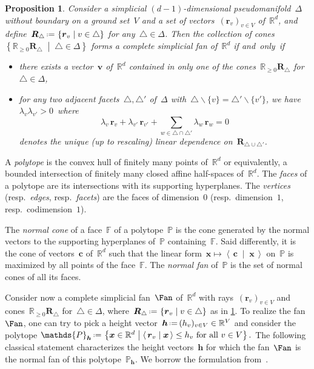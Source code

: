 \documentclass{amsart}
\newtheorem{proposition}[theorem]{Proposition}
\theoremstyle{definition}
\newcommand{\R}{\mathbb{R}} %
\renewcommand{\b}[1]{{\boldsymbol{#1}}} %
\newcommand{\set}[2]{\left\{ #1 \;\middle|\; #2 \right\}} %
\newcommand{\ssm}{\smallsetminus} %
\newcommand{\dotprod}[2]{\left\langle \, #1 \; \middle| \; #2 \, \right\rangle} %
\newcommand{\eqdef}{\mbox{\,\raisebox{0.2ex}{\scriptsize\ensuremath{\mathrm:}}\ensuremath{=}\,}} %
\newcommand{\darkblue}{\color{darkblue}} %
\newcommand{\defn}[1]{\textsl{\darkblue #1}} %
\newcommand{\polytope}[1]{\mathds{#1}} %
\begin{document}
\begin{proposition}
\label{prop:characterizationFan}
Consider a simplicial $(d-1)$-dimensional pseudomanifold~$\Delta$ without boundary on a ground set~$V$ and a set of vectors~$(\b{r}_v)_{v \in V}$ of~$\R^d$, and define~$\b{R}_\triangle \eqdef \set{\b{r}_v}{v \in \triangle}$ for any~$\triangle \in \Delta$.
Then the collection of cones~$\set{\R_{\ge 0}\b{R}_\triangle}{\triangle \in \Delta}$ forms a complete simplicial fan of~$\R^d$ if and~only~if
\begin{itemize}
\item there exists a vector~$\b{v}$ of~$\R^d$ contained in only one of the cones~$\R_{\ge 0}\b{R}_\triangle$ for~$\triangle \in \Delta$,
\item for any two adjacent facets~$\triangle, \triangle'$ of~$\Delta$ with~$\triangle \ssm \{v\} = \triangle' \ssm \{v'\}$, we have~$\lambda_v \lambda_{v'} > 0$~where
\[
\lambda_v \, \b{r}_v + \lambda_{v'} \, \b{r}_{v'} + \sum_{w \in \triangle \cap \triangle'} \lambda_w \, \b{r}_w = 0
\]
denotes the unique (up to rescaling) linear dependence on~$\b{R}_{\triangle \cup \triangle'}$.
\end{itemize}
\end{proposition}

A \defn{polytope} is the convex hull of finitely many points of~$\R^d$ or equivalently, a bounded intersection of finitely many closed affine half-spaces of~$\R^d$.
The \defn{faces} of a polytope are its intersections with its supporting hyperplanes.
The \defn{vertices} (resp.~\defn{edges}, resp.~\defn{facets}) are the faces of dimension~$0$ (resp.~dimension~$1$, resp.~codimension~$1$).

The \defn{normal cone} of a face~$\polytope{F}$ of a polytope~$\polytope{P}$ is the cone generated by the normal vectors to the supporting hyperplanes of~$\polytope{P}$ containing~$\polytope{F}$.
Said differently, it is the cone of vectors~$\b{c}$ of~$\R^d$ such that the linear form~$\b{x} \mapsto \dotprod{\b{c}}{\b{x}}$ on~$\polytope{P}$ is maximized by all points of the face~$\polytope{F}$.
The \defn{normal fan} of~$\polytope{P}$ is the set of normal cones of all its faces.

\enlargethispage{.6cm}
Consider now a complete simplicial fan~$\Fan$ of~$\R^d$ with rays~$(\b{r}_v)_{v \in V}$ and cones~$\R_{\ge 0} \b{R}_\triangle$ for~${\triangle \in \Delta}$, where~$\b{R}_\triangle \eqdef \set{\b{r}_v}{v \in \triangle}$ as in \cref{prop:characterizationFan}.
To realize the fan~$\Fan$, one can try to pick a height vector~$\b{h} \eqdef (h_v)_{v \in V} \in \R^V$ and consider the polytope
\(
\polytope{P}_{\b{h}} \eqdef \set{\b{x} \in \R^d}{\dotprod{\b{r}_v}{\b{x}} \le h_v \text{ for all } v \in V}.
\)
The following classical statement characterizes the height vectors~$\b{h}$ for which the fan~$\Fan$ is the normal fan of this polytope~$\polytope{P}_{\b{h}}$.
We borrow the formulation from~\cite[Lem.~2.1]{ChapotonFominZelevinsky}.
\end{document}
